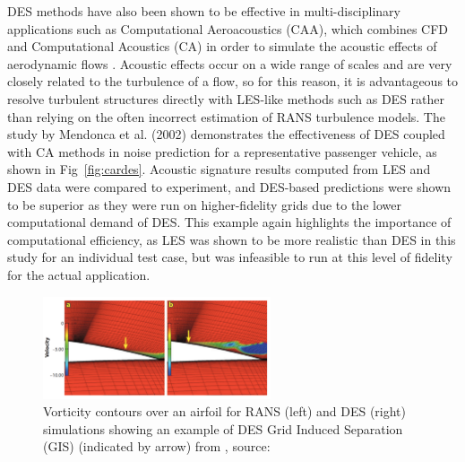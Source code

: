 \documentclass[journal]{new-aiaa}
\begin{document}
DES methods have also been shown to be effective in multi-disciplinary applications such as Computational Aeroacoustics (CAA), which combines CFD and Computational Acoustics (CA) in order to simulate the acoustic effects of aerodynamic flows \cite{mendonca2002towards}. Acoustic effects occur on a wide range of scales and are very closely related to the turbulence of a flow, so for this reason, it is advantageous to resolve turbulent structures directly with LES-like methods such as DES rather than relying on the often incorrect estimation of RANS turbulence models. The study by Mendonca et al. (2002) demonstrates the effectiveness of DES coupled with CA methods in noise prediction for a representative passenger vehicle, as shown in Fig~\ref{fig:cardes}. Acoustic signature results computed from LES and DES data were compared to experiment, and DES-based predictions were shown to be superior as they were run on higher-fidelity grids due to the lower computational demand of DES. This example again highlights the importance of computational efficiency, as LES was shown to be more realistic than DES in this study for an individual test case, but was infeasible to run at this level of fidelity for the actual application.




















\begin{figure}[H]
\begin{center}
\includegraphics[width=0.6\textwidth]{Images/logan/spalart2009detachededdy_GridInducedSeparation.pdf}
\caption{ Vorticity contours over an airfoil for RANS (left) and DES (right) simulations showing an example of DES Grid Induced Separation (GIS) (indicated by arrow) from \cite{spalart2009detachededdy}, source: \cite{menter2004adaptation} }
\label{fig:desgridinducedseparation}
\end{center}
\end{figure}
\end{document}
